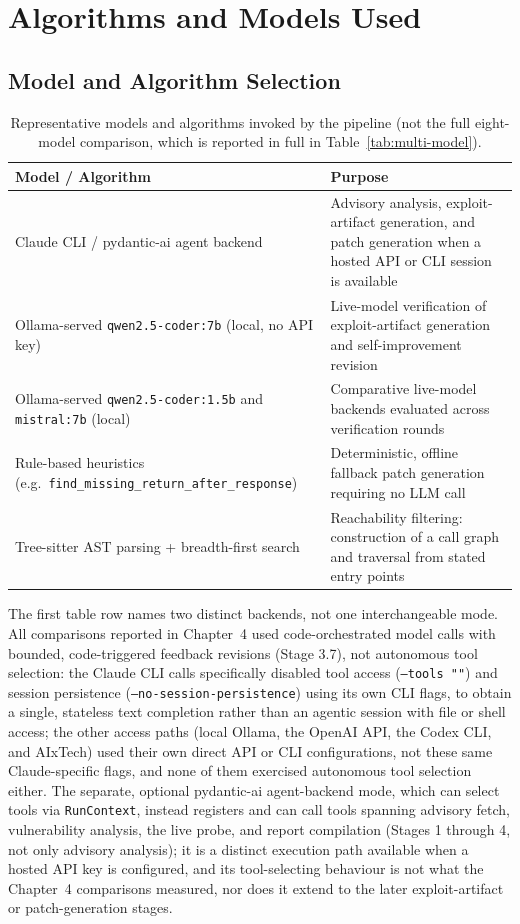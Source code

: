 \documentclass[12pt,a4paper]{report}
\begin{document}
\section{Algorithms and Models Used}

\subsection{Model and Algorithm Selection}

\begin{table}[H]
\centering
\caption{Representative models and algorithms invoked by the pipeline (not the full eight-model comparison, which is reported in full in Table~\ref{tab:multi-model}).}
\begin{tabular}{@{}p{5.5cm}p{7.5cm}@{}}
\toprule
\textbf{Model / Algorithm} & \textbf{Purpose} \\
\midrule
Claude CLI / pydantic-ai agent backend & Advisory analysis, exploit-artifact generation, and patch generation when a hosted API or CLI session is available \\
Ollama-served \texttt{qwen2.5-coder:7b} (local, no API key) & Live-model verification of exploit-artifact generation and self-improvement revision \\
Ollama-served \texttt{qwen2.5-coder:1.5b} and \texttt{mistral:7b} (local) & Comparative live-model backends evaluated across verification rounds \\
Rule-based heuristics (e.g.\ \texttt{find\_\allowbreak missing\_\allowbreak return\_\allowbreak after\_\allowbreak response}) & Deterministic, offline fallback patch generation requiring no LLM call \\
Tree-sitter AST parsing + breadth-first search & Reachability filtering: construction of a call graph and traversal from stated entry points \\
\bottomrule
\end{tabular}
\end{table}

The first table row names two distinct backends, not one interchangeable mode. All comparisons reported in Chapter~4 used code-orchestrated model calls with bounded, code-triggered feedback revisions (Stage 3.7), not autonomous tool selection: the Claude CLI calls specifically disabled tool access (\texttt{--tools ""}) and session persistence (\texttt{--no-session-persistence}) using its own CLI flags, to obtain a single, stateless text completion rather than an agentic session with file or shell access; the other access paths (local Ollama, the OpenAI API, the Codex CLI, and AIxTech) used their own direct API or CLI configurations, not these same Claude-specific flags, and none of them exercised autonomous tool selection either. The separate, optional pydantic-ai agent-backend mode, which can select tools via \texttt{RunContext}, instead registers and can call tools spanning advisory fetch, vulnerability analysis, the live probe, and report compilation (Stages 1 through 4, not only advisory analysis); it is a distinct execution path available when a hosted API key is configured, and its tool-selecting behaviour is not what the Chapter~4 comparisons measured, nor does it extend to the later exploit-artifact or patch-generation stages.
\end{document}
